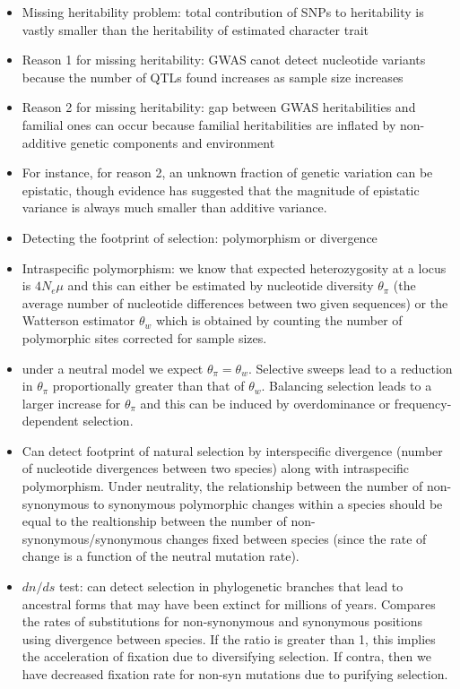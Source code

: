 \documentclass[12pt]{amsart}
\begin{document}
\begin{itemize}
\item Missing heritability problem: total contribution of SNPs to heritability is vastly smaller than the heritability of estimated character trait 
\item Reason 1 for missing heritability: GWAS canot detect nucleotide variants because the number of QTLs found increases as sample size increases 
\item Reason 2 for missing heritability: gap between GWAS heritabilities and familial ones can occur because familial heritabilities are inflated by non-additive genetic components and environment 
\item For instance, for reason 2, an unknown fraction of genetic variation can be epistatic, though evidence has suggested that the magnitude of epistatic variance is always much smaller than additive variance. 
\item Detecting the footprint of selection: polymorphism or divergence
\item Intraspecific polymorphism: we know that expected heterozygosity at a locus is $4N_e\mu$ and this can either be estimated by nucleotide diversity $\theta_{\pi}$ (the average number of nucleotide differences between two given sequences) or the Watterson estimator $\theta_w$ which is obtained by counting the number of polymorphic sites corrected for sample sizes.
\item under a neutral model we expect $\theta_{\pi} = \theta_w$. Selective sweeps lead to a reduction in $\theta_{\pi}$ proportionally greater than that of $\theta_w$. Balancing selection leads to a larger increase for $\theta_{\pi}$ and this can be induced by overdominance or frequency-dependent selection.
\item Can detect footprint of natural selection by interspecific divergence (number of nucleotide divergences between two species) along with intraspecific polymorphism. Under neutrality, the relationship between the number of non-synonymous to synonymous polymorphic changes within a species should be equal to the realtionship between the number of non-synonymous/synonymous changes fixed between species (since the rate of change is a function of the neutral mutation rate). 
\item $dn/ds$ test: can detect selection in phylogenetic branches that lead to ancestral forms that may have been extinct for millions of years. Compares the rates of substitutions for non-synonymous and synonymous positions using divergence between species. If the ratio is greater than 1, this implies the acceleration of fixation due to diversifying selection. If contra, then we have decreased fixation rate for non-syn mutations due to purifying selection.

\end{itemize}
\end{document}
